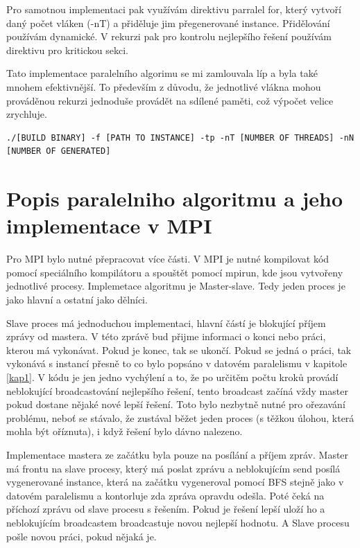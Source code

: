 \documentclass[epsf,epic,eepic,eepicemu]{article}
\begin{document}
Pro samotnou implementaci pak využívám direktivu parralel for, který vytvoří daný počet vláken (-nT) a přiděluje jim přegenerované instance. Přidělování používám dynamické. V rekurzi pak pro kontrolu nejlepšího řešení používám direktivu pro kritickou sekci.

Tato implementace paralelního algorimu se mi zamlouvala líp a byla také mnohem efektivnější. To především z důvodu, že jednotlivé vlákna mohou prováděnou rekurzi jednoduše provádět na sdílené paměti, což výpočet velice zrychluje. 

\begin{verbatim}
./[BUILD BINARY] -f [PATH TO INSTANCE] -tp -nT [NUMBER OF THREADS] -nN [NUMBER OF GENERATED]
\end{verbatim}


\section{Popis paralelniho algoritmu a jeho implementace v MPI}

Pro MPI bylo nutné přepracovat více části. V MPI je nutné kompilovat kód pomocí speciálního kompilátoru a spouštět pomocí mpirun, kde jsou vytvořeny jednotlivé procesy. Implemetace algoritmu je Master-slave. Tedy jeden proces je jako hlavní a ostatní jako dělníci. 

Slave proces má jednoduchou implementaci, hlavní částí je blokující příjem zprávy od mastera. V této zprávě bud přijme informaci o konci nebo práci, kterou má vykonávat. Pokud je konec, tak se ukončí. Pokud se jedná o práci, tak vykonává s instancí přesně to co bylo popsáno v datovém paralelismu v kapitole \ref{kap1}. V kódu je jen jedno vychýlení a to, že po určitěm počtu kroků provádí neblokující broadcastování nejlepšího řešení, tento broadcast začíná vždy master pokud dostane nějaké nové lepší řešení. Toto bylo nezbytně nutné pro ořezavání problému, neboť se stávalo, že zustával běžet jeden proces (s těžkou úlohou, která mohla být oříznuta), i když řešení bylo dávno nalezeno.

Implementace mastera ze začátku byla pouze na posílání a příjem zpráv. Master má frontu na slave procesy, který má poslat zprávu a neblokujícím send posílá vygenerované instance, která na začátku vygeneroval pomocí BFS stejně jako v datovém paralelismu a kontorluje zda zpráva opravdu odešla. Poté čeká na příchozí zprávu od slave procesu s řešením. Pokud je řešení lepší uloží ho a neblokujícím broadcastem broadcastuje novou nejlepší hodnotu. A Slave procesu pošle novou práci, pokud nějaká je. 
\end{document}
